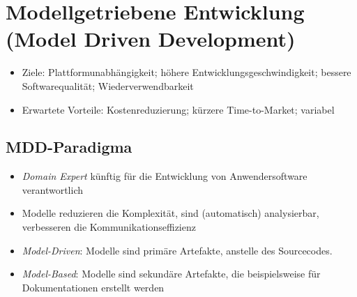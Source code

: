 \section{Modellgetriebene Entwicklung (Model Driven Development)}
\begin{itemize}
	\item Ziele: Plattformunabhängigkeit; höhere Entwicklungsgeschwindigkeit; bessere Softwarequalität; Wiederverwendbarkeit
	\item Erwartete Vorteile: Kostenreduzierung; kürzere Time-to-Market; variabel
\end{itemize}


\subsection{MDD-Paradigma}
\begin{itemize}
	\item \textit{Domain Expert} künftig für die Entwicklung von Anwendersoftware verantwortlich
	\item Modelle reduzieren die Komplexität, sind (automatisch) analysierbar, verbesseren die Kommunikationseffizienz
	\item \textit{Model-Driven}: Modelle sind primäre Artefakte, anstelle des Sourcecodes.
	\item \textit{Model-Based}: Modelle sind sekundäre Artefakte, die beispielsweise für Dokumentationen erstellt werden
\end{itemize}

